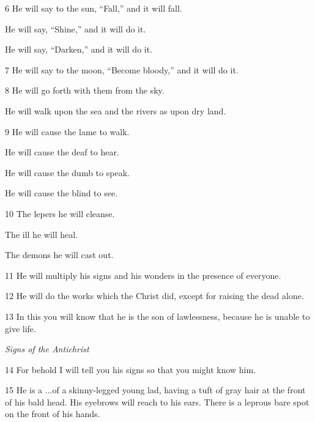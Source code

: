 \par 6 He will say to the sun, “Fall,” and it will fall.

\par He will say, “Shine,” and it will do it.

\par He will say, “Darken,” and it will do it.

\par 7 He will say to the moon, “Become bloody,” and it will do it.

\par 8 He will go forth with them from the sky.

\par He will walk upon the sea and the rivers as upon dry land.

\par 9 He will cause the lame to walk.

\par He will cause the deaf to hear.

\par He will cause the dumb to speak.

\par He will cause the blind to see.

\par 10 The lepers he will cleanse.

\par The ill he will heal.

\par The demons he will cast out.

\par 11 He will multiply his signs and his wonders in the presence of everyone.

\par 12 He will do the works which the Christ did, except for raising the dead alone.

\par 13 In this you will know that he is the son of lawlessness, because he is unable to give life.

\par \textit{Signs of the Antichrist}

\par 14 For behold I will tell you his signs so that you might know him.

\par 15 He is a ...of a skinny-legged young lad, having a tuft of gray hair at the front of his bald head. His eyebrows will reach to his ears. There is a leprous bare spot on the front of his hands.

